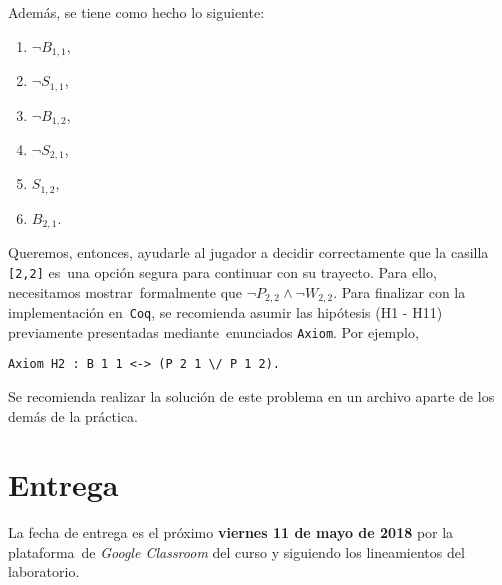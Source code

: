 \documentclass[paper=letter, fontsize=12pt]{scrartcl}
\begin{document}
Además, se tiene como hecho lo siguiente:
\begin{enumerate}[label=H\arabic*, resume]
\item $\neg B_{1,1}$,
\item $\neg S_{1,1}$,
\item $\neg B_{1,2}$,
\item $\neg S_{2,1}$,
\item $S_{1,2}$,
\item $B_{2,1}$.
\end{enumerate}
Queremos, entonces, ayudarle al jugador a decidir correctamente que la casilla \verb+[2,2]+ es\
una opción segura para continuar con su trayecto. Para ello, necesitamos mostrar\
formalmente que $\neg P_{2,2} \wedge \neg W_{2,2}$. Para finalizar con la implementación en\
\verb+Coq+, se recomienda asumir las hipótesis (H1 - H11) previamente presentadas mediante\
enunciados \verb+Axiom+. Por ejemplo,
\begin{verbatim}
Axiom H2 : B 1 1 <-> (P 2 1 \/ P 1 2).
\end{verbatim}\par
Se recomienda realizar la solución de este problema en un archivo aparte de los demás de la práctica.

\section{Entrega}

\noindent
La fecha de entrega es el próximo \textbf{viernes 11 de mayo de 2018} por la plataforma\
de \emph{Google Classroom} del curso y siguiendo los lineamientos del laboratorio.
\end{document}

